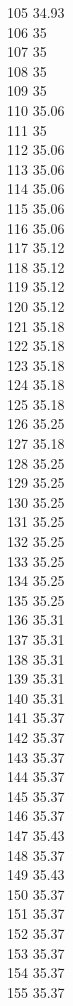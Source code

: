 105	34.93\\
106	35\\
107	35\\
108	35\\
109	35\\
110	35.06\\
111	35\\
112	35.06\\
113	35.06\\
114	35.06\\
115	35.06\\
116	35.06\\
117	35.12\\
118	35.12\\
119	35.12\\
120	35.12\\
121	35.18\\
122	35.18\\
123	35.18\\
124	35.18\\
125	35.18\\
126	35.25\\
127	35.18\\
128	35.25\\
129	35.25\\
130	35.25\\
131	35.25\\
132	35.25\\
133	35.25\\
134	35.25\\
135	35.25\\
136	35.31\\
137	35.31\\
138	35.31\\
139	35.31\\
140	35.31\\
141	35.37\\
142	35.37\\
143	35.37\\
144	35.37\\
145	35.37\\
146	35.37\\
147	35.43\\
148	35.37\\
149	35.43\\
150	35.37\\
151	35.37\\
152	35.37\\
153	35.37\\
154	35.37\\
155	35.37\\
